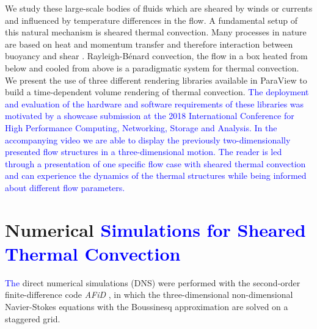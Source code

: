 \documentclass[5p,times]{elsarticle}
\begin{document}
We study these large-scale bodies of fluids which are sheared by winds or currents and influenced by temperature differences in the flow. A fundamental setup of this natural mechanism is sheared thermal convection. Many processes in nature are based on heat and momentum transfer and therefore interaction between buoyancy \cite{ahl09,loh10} and shear \cite{smi11,bar07}. Rayleigh-B\'enard convection, the flow in a box heated from below and cooled from above is a paradigmatic system for thermal convection. We present the use of three different rendering libraries available in ParaView \cite{Ahrens2005} to build a time-dependent volume rendering of thermal convection. \textcolor{blue}{The deployment and evaluation of the hardware and software requirements of these libraries was motivated by a showcase submission at the 2018 International Conference for High Performance Computing, Networking, Storage and Analysis. In the accompanying video \cite{fav18} we are able to display the previously two-dimensionally presented flow structures in a three-dimensional motion. The reader is led through a presentation of one specific flow case with sheared thermal convection and can experience the dynamics of the thermal structures while being informed about different flow parameters.} 

\section{Numerical \textcolor{blue}{Simulations for Sheared Thermal Convection}}
\textcolor{blue}{The} direct numerical simulations (DNS) were performed with the second-order finite-difference
code \textit{AFiD} \cite{poe15c}, in which the three-dimensional non-dimensional
Navier-Stokes equations with the Boussinesq approximation are solved on a staggered grid.

%
%
\end{document}

